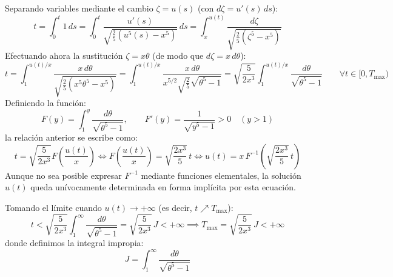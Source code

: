 {    \medskip

    Separando variables mediante el cambio $\zeta = u(s)$ (con $d\zeta = u'(s)\, ds$):
    \[
        t = \int_0^t 1\, ds = \int_0^t \frac{u'(s)}{\sqrt{\tfrac{2}{5}(u^5(s) - x^5)}}\, ds = \int_x^{u(t)} \frac{d\zeta}{\sqrt{\tfrac{2}{5}(\zeta^5 - x^5)}}
    \]
    Efectuando ahora la sustitución $\zeta = x \theta$ (de modo que $d\zeta = x\, d\theta$):
    \[
        t = \int_1^{u(t)/x} \frac{x\, d\theta}{\sqrt{\tfrac{2}{5}(x^5 \theta^5 - x^5)}} = \int_1^{u(t)/x} \frac{x\, d\theta}{x^{5/2} \sqrt{\tfrac{2}{5}} \sqrt{\theta^5 - 1}} = \sqrt{\frac{5}{2x^3}} \int_1^{u(t)/x} \frac{d\theta}{\sqrt{\theta^5 - 1}} \qquad \forall t \in [0, T_{\max})
    \]
    Definiendo la función:
    \[
        F(y) = \int_1^y \frac{d\theta}{\sqrt{\theta^5 - 1}}, \qquad F'(y) = \frac{1}{\sqrt{y^5 - 1}} > 0 \quad (y > 1)
    \]
    la relación anterior se escribe como:
    \[
        t = \sqrt{\frac{5}{2x^3}} F\left(\frac{u(t)}{x}\right) \iff F\left(\frac{u(t)}{x}\right) = \sqrt{\frac{2x^3}{5}}\, t \iff u(t) = x \, F^{-1}\left( \sqrt{\frac{2x^3}{5}}\, t \right)
    \]
    Aunque no sea posible expresar $F^{-1}$ mediante funciones elementales, la solución $u(t)$ queda unívocamente determinada en forma implícita por esta ecuación.

    \medskip

    Tomando el límite cuando $u(t) \to +\infty$ (es decir, $t \nearrow T_{\max}$):
    \[
        t < \sqrt{\frac{5}{2x^3}} \int_1^\infty \frac{d\theta}{\sqrt{\theta^5 - 1}} = \sqrt{\frac{5}{2x^3}}\, J < +\infty \implies T_{\max} = \sqrt{\frac{5}{2x^3}}\, J < +\infty
    \]
    donde definimos la integral impropia:
    \[
        J = \int_1^\infty \frac{d\theta}{\sqrt{\theta^5 - 1}}
    \]

    \medskip

}
